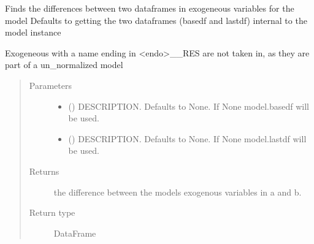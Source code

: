 \documentclass[letterpaper,10pt,english]{sphinxmanual}
\begin{document}
\begin{fulllineitems}
\begin{fulllineitems}
\label{\detokenize{core/modelclass:modelclass.Org_model_Mixin.exodif}}
\pysigstartsignatures
{}
\pysigstopsignatures
\sphinxAtStartPar
Finds the differences between two dataframes in exogeneous variables for the model
Defaults to getting the two dataframes (basedf and lastdf) internal to the model instance

\sphinxAtStartPar
Exogeneous with a name ending in \textless{}endo\textgreater{}\_\_RES are not taken in, as they are part of a un\_normalized model
\begin{quote}\begin{description}
\item[{Parameters}] \leavevmode\begin{itemize}
\item {} 
\sphinxAtStartPar
{} (\sphinxstyleliteralemphasis{\sphinxupquote{, }}) \textendash{} DESCRIPTION. Defaults to None. If None model.basedf will be used.

\item {} 
\sphinxAtStartPar
{} (\sphinxstyleliteralemphasis{\sphinxupquote{, }}) \textendash{} DESCRIPTION. Defaults to None. If None model.lastdf will be used.

\end{itemize}

\item[{Returns}] \leavevmode
\sphinxAtStartPar
the difference between the models exogenous variables in a and b.

\item[{Return type}] \leavevmode
\sphinxAtStartPar
DataFrame

\end{description}\end{quote}

\end{fulllineitems}



\end{fulllineitems}
\end{document}
